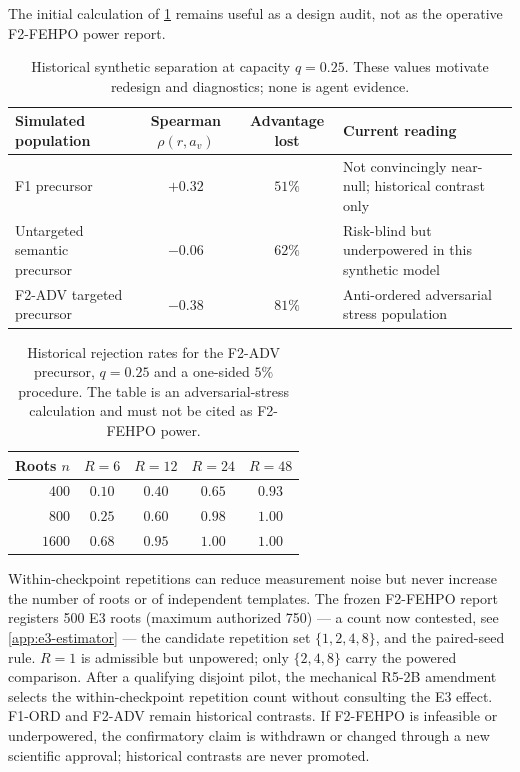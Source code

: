 The initial calculation of \cref{tab:separation} remains useful as a design
audit, not as the operative F2-FEHPO power report.

\begin{table}[H]
\centering\small
\begin{tabular}{@{}p{3.0cm}ccp{4.8cm}@{}}
\toprule
Simulated population & Spearman $\rho(r,a_v)$ & Advantage lost & Current reading \\
\midrule
F1 precursor & $+0.32$ & $51\%$ & Not convincingly near-null; historical contrast only \\
Untargeted semantic precursor & $-0.06$ & $62\%$ & Risk-blind but underpowered in this synthetic model \\
F2-ADV targeted precursor & $-0.38$ & $81\%$ & Anti-ordered adversarial stress population \\
\bottomrule
\end{tabular}
\caption{Historical synthetic separation at capacity $q=0.25$.  These values
motivate redesign and diagnostics; none is agent evidence.}
\label{tab:separation}
\end{table}

\begin{table}[H]
\centering\small
\begin{tabular}{@{}rcccc@{}}
\toprule
Roots $n$ & $R{=}6$ & $R{=}12$ & $R{=}24$ & $R{=}48$ \\
\midrule
$400$  & $0.10$ & $0.40$ & $0.65$ & $0.93$ \\
$800$  & $0.25$ & $0.60$ & $0.98$ & $1.00$ \\
$1600$ & $0.68$ & $0.95$ & $1.00$ & $1.00$ \\
\bottomrule
\end{tabular}
\caption{Historical rejection rates for the F2-ADV precursor, $q=0.25$ and a
one-sided $5\%$ procedure.  The table is an adversarial-stress calculation and
must not be cited as F2-FEHPO power.}
\label{tab:faultpower}
\end{table}

Within-checkpoint repetitions can reduce measurement noise but never increase
the number of roots or of independent templates.  The frozen F2-FEHPO report registers 500
E3 roots (maximum authorized 750) --- a count now contested, see
\cref{app:e3-estimator} --- the candidate repetition set $\{1,2,4,8\}$, and the
paired-seed rule.  $R=1$ is admissible but unpowered; only $\{2,4,8\}$ carry the
powered comparison.  After a qualifying disjoint pilot, the
mechanical R5-2B amendment selects the within-checkpoint repetition count
without consulting the E3 effect.  F1-ORD and F2-ADV remain historical contrasts.  If
F2-FEHPO is infeasible or underpowered, the
confirmatory claim is withdrawn or changed through a new scientific approval;
historical contrasts are never promoted.
